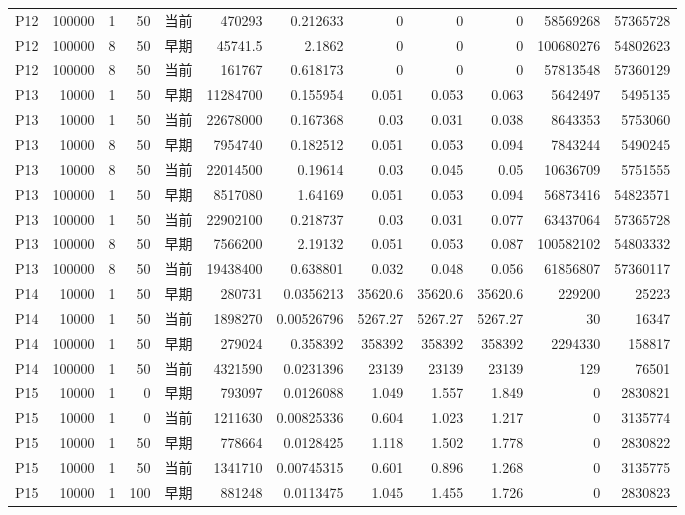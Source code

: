 \documentclass[UTF8,a4paper,10pt,twocolumn,fontset=fandol]{ctexart}
\begin{document}
\begin{longtable}{@{}lrrrlrrrrrrr@{}}
P12 & 100000 & 1 & 50 & 当前 & 470293 & 0.212633 & 0 & 0 & 0 & 58569268 & 57365728 \\
P12 & 100000 & 8 & 50 & 早期 & 45741.5 & 2.1862 & 0 & 0 & 0 & 100680276 & 54802623 \\
P12 & 100000 & 8 & 50 & 当前 & 161767 & 0.618173 & 0 & 0 & 0 & 57813548 & 57360129 \\
P13 & 10000 & 1 & 50 & 早期 & 11284700 & 0.155954 & 0.051 & 0.053 & 0.063 & 5642497 & 5495135 \\
P13 & 10000 & 1 & 50 & 当前 & 22678000 & 0.167368 & 0.03 & 0.031 & 0.038 & 8643353 & 5753060 \\
P13 & 10000 & 8 & 50 & 早期 & 7954740 & 0.182512 & 0.051 & 0.053 & 0.094 & 7843244 & 5490245 \\
P13 & 10000 & 8 & 50 & 当前 & 22014500 & 0.19614 & 0.03 & 0.045 & 0.05 & 10636709 & 5751555 \\
P13 & 100000 & 1 & 50 & 早期 & 8517080 & 1.64169 & 0.051 & 0.053 & 0.094 & 56873416 & 54823571 \\
P13 & 100000 & 1 & 50 & 当前 & 22902100 & 0.218737 & 0.03 & 0.031 & 0.077 & 63437064 & 57365728 \\
P13 & 100000 & 8 & 50 & 早期 & 7566200 & 2.19132 & 0.051 & 0.053 & 0.087 & 100582102 & 54803332 \\
P13 & 100000 & 8 & 50 & 当前 & 19438400 & 0.638801 & 0.032 & 0.048 & 0.056 & 61856807 & 57360117 \\
P14 & 10000 & 1 & 50 & 早期 & 280731 & 0.0356213 & 35620.6 & 35620.6 & 35620.6 & 229200 & 25223 \\
P14 & 10000 & 1 & 50 & 当前 & 1898270 & 0.00526796 & 5267.27 & 5267.27 & 5267.27 & 30 & 16347 \\
P14 & 100000 & 1 & 50 & 早期 & 279024 & 0.358392 & 358392 & 358392 & 358392 & 2294330 & 158817 \\
P14 & 100000 & 1 & 50 & 当前 & 4321590 & 0.0231396 & 23139 & 23139 & 23139 & 129 & 76501 \\
P15 & 10000 & 1 & 0 & 早期 & 793097 & 0.0126088 & 1.049 & 1.557 & 1.849 & 0 & 2830821 \\
P15 & 10000 & 1 & 0 & 当前 & 1211630 & 0.00825336 & 0.604 & 1.023 & 1.217 & 0 & 3135774 \\
P15 & 10000 & 1 & 50 & 早期 & 778664 & 0.0128425 & 1.118 & 1.502 & 1.778 & 0 & 2830822 \\
P15 & 10000 & 1 & 50 & 当前 & 1341710 & 0.00745315 & 0.601 & 0.896 & 1.268 & 0 & 3135775 \\
P15 & 10000 & 1 & 100 & 早期 & 881248 & 0.0113475 & 1.045 & 1.455 & 1.726 & 0 & 2830823 \\

\end{longtable}
\end{document}
